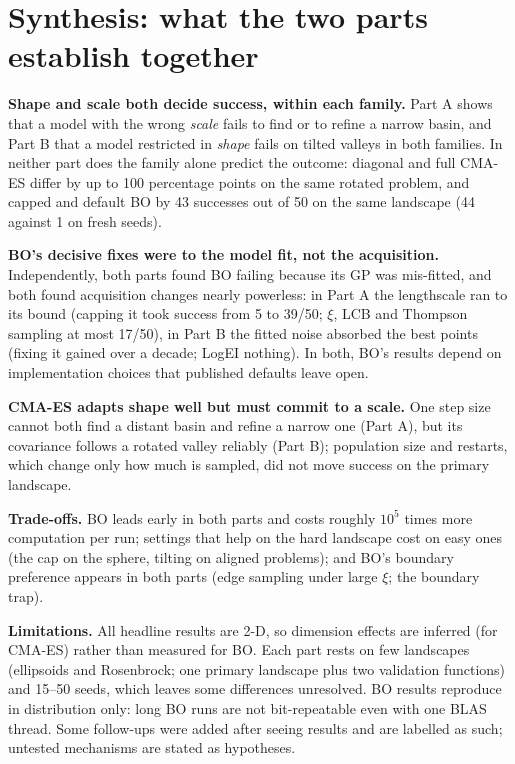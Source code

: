 \documentclass[10pt,a4paper]{article}
\begin{document}
\section{Synthesis: what the two parts establish together}\label{sec:synth}
\textbf{Shape and scale both decide success, within each family.} Part A shows that a model with the wrong
\emph{scale} fails to find or to refine a narrow basin, and Part B that a model restricted in \emph{shape} fails on
tilted valleys in both families. In neither part does the family alone predict the outcome: diagonal and full
CMA-ES differ by up to 100 percentage points on the same rotated problem, and capped and default BO by 43 successes out of 50
on the same landscape (44 against 1 on fresh seeds).

\textbf{BO's decisive fixes were to the model fit, not the acquisition.} Independently, both parts found BO
failing because its GP was mis-fitted, and both found acquisition changes nearly powerless: in Part A the lengthscale
ran to its bound (capping it took success from 5 to 39/50; $\xi$, LCB and Thompson sampling at most 17/50), in Part B
the fitted noise absorbed the best points (fixing it gained over a decade; LogEI nothing). In both, BO's
results depend on implementation choices that published defaults leave open.

\textbf{CMA-ES adapts shape well but must commit to a scale.} One step size cannot both find a distant basin and refine a
narrow one (Part A), but its covariance follows a rotated valley reliably (Part B); population size and restarts,
which change only how much is sampled, did not move success on the primary landscape.

\textbf{Trade-offs.} BO leads early in both parts and costs roughly $10^5$ times more computation per run; settings
that help on the hard landscape cost on easy ones (the cap on the sphere, tilting on aligned problems); and BO's
boundary preference appears in both parts (edge sampling under large $\xi$; the boundary trap).

\textbf{Limitations.} All headline results are 2-D, so dimension effects are inferred (for CMA-ES) rather than
measured for BO. Each part rests on few landscapes (ellipsoids and Rosenbrock; one primary landscape plus two validation
functions) and 15--50 seeds, which leaves some differences unresolved. BO results reproduce in distribution only: long
BO runs are not bit-repeatable even with one BLAS thread. Some follow-ups were added after seeing results and are
labelled as such; untested mechanisms are stated as hypotheses.

\clearpage
\small


\end{document}
